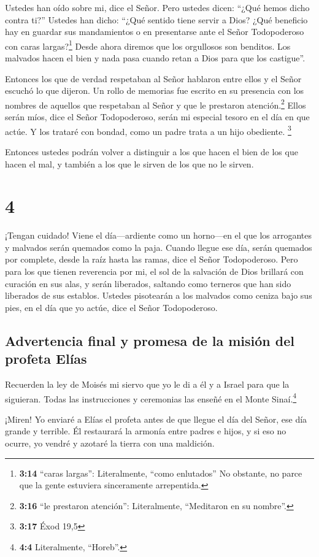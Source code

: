  Ustedes han oído sobre mi, dice el Señor. Pero ustedes
dicen: ``¿Qué hemos dicho contra ti?''  Ustedes han
dicho: ``¿Qué sentido tiene servir a Dios? ¿Qué beneficio hay en guardar
sus mandamientos o en presentarse ante el Señor Todopoderoso con caras
largas?\footnote{\textbf{3:14} ``caras largas'': Literalmente, ``como
  enlutados'' No obstante, no parce que la gente estuviera sinceramente
  arrepentida.}  Desde ahora diremos que los orgullosos
son benditos. Los malvados hacen el bien y nada pasa cuando retan a Dios
para que los castigue''.

 Entonces los que de verdad respetaban al Señor hablaron
entre ellos y el Señor escuchó lo que dijeron. Un rollo de memorias fue
escrito en su presencia con los nombres de aquellos que respetaban al
Señor y que le prestaron atención.\footnote{\textbf{3:16} ``le prestaron
  atención'': Literalmente, ``Meditaron en su nombre''.} 
Ellos serán míos, dice el Señor Todopoderoso, serán mi especial tesoro
en el día en que actúe. Y los trataré con bondad, como un padre trata a
un hijo obediente. \footnote{\textbf{3:17} Éxod 19,5}

 Entonces ustedes podrán volver a distinguir a los que
hacen el bien de los que hacen el mal, y también a los que le sirven de
los que no le sirven.

\hypertarget{section-3}{%
\section{4}\label{section-3}}

 ¡Tengan cuidado! Viene el día---ardiente como un
horno---en el que los arrogantes y malvados serán quemados como la paja.
Cuando llegue ese día, serán quemados por complete, desde la raíz hasta
las ramas, dice el Señor Todopoderoso.  Pero para los que
tienen reverencia por mi, el sol de la salvación de Dios brillará con
curación en sus alas, y serán liberados, saltando como terneros que han
sido liberados de sus establos.  Ustedes pisotearán a los
malvados como ceniza bajo sus pies, en el día que yo actúe, dice el
Señor Todopoderoso.

\hypertarget{advertencia-final-y-promesa-de-la-misiuxf3n-del-profeta-eluxedas}{%
\subsection{Advertencia final y promesa de la misión del profeta
Elías}\label{advertencia-final-y-promesa-de-la-misiuxf3n-del-profeta-eluxedas}}

 Recuerden la ley de Moisés mi siervo que yo le di a él y
a Israel para que la siguieran. Todas las instrucciones y ceremonias las
enseñé en el Monte Sinaí.\footnote{\textbf{4:4} Literalmente, ``Horeb''.}

 ¡Miren! Yo enviaré a Elías el profeta antes de que llegue
el día del Señor, ese día grande y terrible.  Él
restaurará la armonía entre padres e hijos, y si eso no ocurre, yo
vendré y azotaré la tierra con una maldición.
